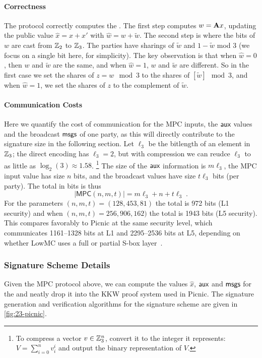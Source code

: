 \paragraph{Correctness} The protocol correctly computes the \ttOWF.  The
first step computes $w = \mathbf{A} x$, 
updating the public value $\hat{x} = x + x'$ with $\hat{w} = w + \tilde{w}$.  The
second step is where the bits of $w$ are cast from $\mathbb{Z}_2$ to $\mathbb{Z}_3$.  The 
parties have sharings of $\tilde{w}$ and $1-\tilde{w}$ mod 3 (we focus on a single bit here, for simplicity). The key observation is
that when $\hat{w} = 0$, then $w$ and $\tilde{w}$ are the same, and when $\hat{w} =
1$, $w$ and $\tilde{w}$ are different. So in the first case we set the shares of $ z =
w \mod 3$ to the shares of $[\tilde{w}] \mod 3$, and when $\hat{w} = 1$, we set the
shares of $z$ to the complement of $\tilde{w}$.

\paragraph{Communication Costs}
Here we quantify the cost of communication for the MPC inputs, the $\textsf{aux}$ values and the broadcast $\textsf{msgs}$ of one party,
as this will directly contribute to the signature size in the following section. 
Let $\ell_3$ be the bitlength of an element in $\mathbb{Z}_3$; the direct encoding has
$\ell_3 = 2$, but with compression we can reudce $\ell_3$ to as little as
$\log_2(3) \approx 1.58$. \footnote{To compress a vector $v\in\mathbb{Z}_3^{n}$, convert it to the integer it represents: $V = \sum_{i=0}^n v_i^{i}$
and output the binary representation of $V$.  }   The size of the
$\textsf{aux}$ information is $m\ell_3$, the MPC input value has size $n$ bits, 
and the broadcast values have size $t\ell_3$ bits (per party). 
The total in bits is thus 
\begin{equation} \label{eqn:sizeMPC}
|\textsf{MPC}(n,m,t)| = m\ell_3 + n + t\ell_3\;.
\end{equation}
For the parameters 
$(n,m,t)=(128, 453, 81)$ the total is 972 bits (L1 security)
and when $(n,m,t) = 256, 906, 162)$ the total is 1943 bits (L5 security).  This compares favorably to
Picnic at the same security level, which communicates 1161--1328 bits at L1
and 2295--2536 bits at L5, depending on whether LowMC uses a full or partial S-box layer~\cite{TCHES:KalZav20}.

\subsubsection{Signature Scheme Details}
Given the MPC protocol above, we can compute the values $\hat{x}$, $\textsf{aux}$ and
$\textsf{msgs}$ for the \ttOWF and neatly drop it into the KKW proof system used in
Picnic.  The signature generation and verification algorithms for the
\ttOWF  signature scheme are given in \cref{fig:23-picnic}.

